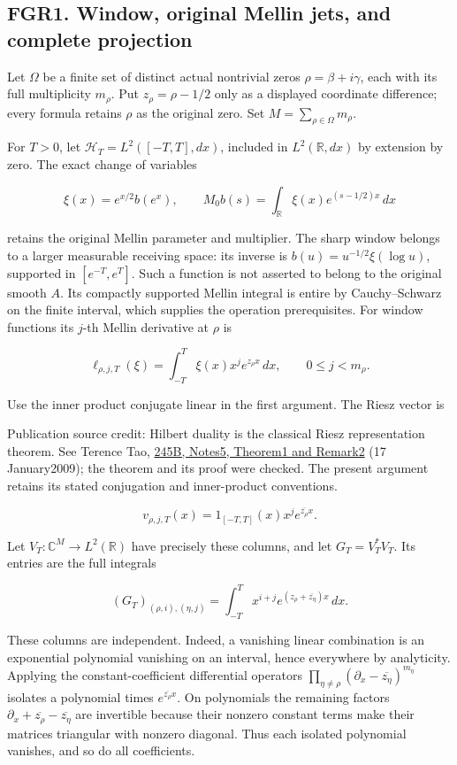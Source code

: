 \subsection{FGR1. Window, original Mellin jets, and complete
projection}\label{fgr1.-window-original-mellin-jets-and-complete-projection}

Let \(\Omega\) be a finite set of distinct actual nontrivial zeros
\(\rho=\beta+i\gamma\), each with its full multiplicity \(m_\rho\). Put
\(z_\rho=\rho-1/2\) only as a displayed coordinate difference; every
formula retains \(\rho\) as the original zero. Set
\(M=\sum_{\rho\in\Omega}m_\rho\).

For \(T>0\), let \(\mathscr H_T=L^2([-T,T],dx)\), included in
\(L^2(\mathbb R,dx)\) by extension by zero. The exact change of
variables

\[
 \xi(x)=e^{x/2}b(e^x),\qquad
 M_0b(s)=\int_{\mathbb R}\xi(x)e^{(s-1/2)x}\,dx
\tag{FGR1.1}
\]

retains the original Mellin parameter and multiplier. The sharp window
belongs to a larger measurable receiving space: its inverse is
\(b(u)=u^{-1/2}\xi(\log u)\), supported in \([e^{-T},e^T]\). Such a
function is not asserted to belong to the original smooth \(A\). Its
compactly supported Mellin integral is entire by Cauchy--Schwarz on the
finite interval, which supplies the operation prerequisites. For window
functions its \(j\)-th Mellin derivative at \(\rho\) is

\[
 \ell_{\rho,j,T}(\xi)=\int_{-T}^T \xi(x)x^j e^{z_\rho x}\,dx,
 \qquad 0\leq j<m_\rho.
\tag{FGR1.2}
\]

Use the inner product conjugate linear in the first argument. The Riesz
vector is

Publication source credit: Hilbert duality is the classical Riesz
representation theorem. See Terence Tao,
\href{https://terrytao.wordpress.com/2009/01/17/254a-notes-5-hilbert-spaces/}{245B,
Notes5, Theorem1 and Remark2} (17 January2009); the theorem and its
proof were checked. The present argument retains its stated conjugation
and inner-product conventions.

\[
 v_{\rho,j,T}(x)=1_{[-T,T]}(x)x^j e^{\overline{z_\rho}x}.
\]

Let \(V_T:\mathbb C^M\to L^2(\mathbb R)\) have precisely these columns,
and let \(G_T=V_T^*V_T\). Its entries are the full integrals

\[
 (G_T)_{(\rho,i),(\eta,j)}
 =\int_{-T}^T x^{i+j}e^{(z_\rho+\overline{z_\eta})x}\,dx.
\tag{FGR1.3}
\]

These columns are independent. Indeed, a vanishing linear combination is
an exponential polynomial vanishing on an interval, hence everywhere by
analyticity. Applying the constant-coefficient differential operators
\(\prod_{\eta\ne\rho}(\partial_x-\overline{z_\eta})^{m_\eta}\) isolates
a polynomial times \(e^{\overline{z_\rho}x}\). On polynomials the
remaining factors \(\partial_x+\overline{z_\rho}-\overline{z_\eta}\) are
invertible because their nonzero constant terms make their matrices
triangular with nonzero diagonal. Thus each isolated polynomial
vanishes, and so do all coefficients.

